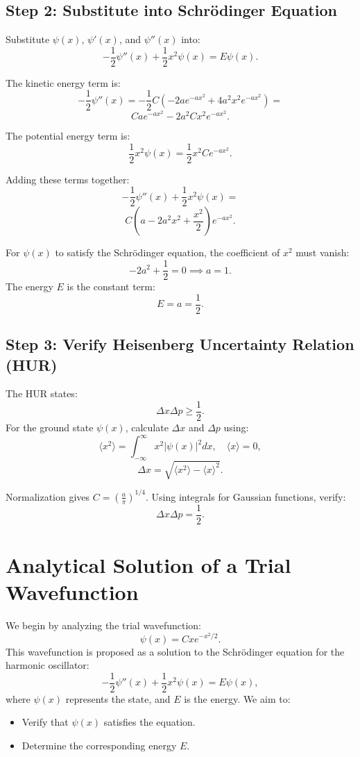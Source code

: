 \documentclass[a4paper,12pt]{article}
\begin{document}
\begin{multicols}{2}
\subsection*{Step 2: Substitute into Schrödinger Equation}
Substitute \( \psi(x) \), \( \psi'(x) \), and \( \psi''(x) \) into:
\[
-\frac{1}{2}\psi''(x) + \frac{1}{2}x^2\psi(x) = E\psi(x).
\]

The kinetic energy term is:
\[
-\frac{1}{2}\psi''(x) = -\frac{1}{2}C\left(-2ae^{-ax^2} + 4a^2x^2e^{-ax^2}\right) = 
\]
\[
Ca e^{-ax^2} - 2a^2Cx^2e^{-ax^2}.
\]

The potential energy term is:
\[
\frac{1}{2}x^2\psi(x) = \frac{1}{2}x^2Ce^{-ax^2}.
\]

Adding these terms together:
\[
-\frac{1}{2}\psi''(x) + \frac{1}{2}x^2\psi(x) = 
\]
\[
C\left(a - 2a^2x^2 + \frac{x^2}{2}\right)e^{-ax^2}.
\]

For \( \psi(x) \) to satisfy the Schrödinger equation, the coefficient of \( x^2 \) must vanish:
\[
-2a^2 + \frac{1}{2} = 0 \implies a = 1.
\]
The energy \( E \) is the constant term:
\[
E = a = \frac{1}{2}.
\]

\subsection*{Step 3: Verify Heisenberg Uncertainty Relation (HUR)}
The HUR states:
\[
\Delta x \Delta p \geq \frac{1}{2}.
\]
For the ground state \( \psi(x) \), calculate \( \Delta x \) and \( \Delta p \) using:
\[
\langle x^2 \rangle = \int_{-\infty}^\infty x^2|\psi(x)|^2 dx, \quad \langle x \rangle = 0,
\]
\[
\Delta x = \sqrt{\langle x^2 \rangle - \langle x \rangle^2}.
\]

Normalization gives \( C = \left(\frac{a}{\pi}\right)^{1/4} \). Using integrals for Gaussian functions, verify:
\[
\Delta x \Delta p = \frac{1}{2}.
\]

\section{Analytical Solution of a Trial Wavefunction}

We begin by analyzing the trial wavefunction:
\[
\psi(x) = Cx e^{-x^2 / 2}.
\]
This wavefunction is proposed as a solution to the Schrödinger equation for the harmonic oscillator:
\[
-\frac{1}{2} \psi''(x) + \frac{1}{2} x^2 \psi(x) = E \psi(x),
\]
where \( \psi(x) \) represents the state, and \( E \) is the energy. We aim to:
\begin{itemize}
    \item Verify that \( \psi(x) \) satisfies the equation.
    \item Determine the corresponding energy \( E \).
\end{itemize}


\end{multicols}
\end{document}
